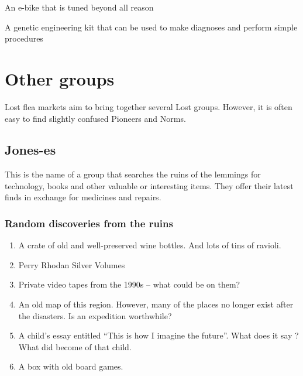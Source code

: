 \begin{npcBox}[title=Flash]
    \begin{consequences}
    \item {}
    \item {}
    \item {}
    \end{consequences}

    \begin{equipment}
    \item An e-bike that is tuned beyond all reason
    \item A genetic engineering kit that can be used to make diagnoses and perform simple procedures
    \end{equipment}
\end{npcBox}
\newpage

\chapter{Other groups}

Lost flea markets aim to bring together several Lost groups. However, it is often easy to find slightly confused Pioneers and Norms.

\section{Jones-es}

This is the name of a group that searches the ruins of the lemmings for technology, books and other valuable or interesting items. They offer their latest finds in exchange for medicines and repairs.

\subsection{Random discoveries from the ruins}

\begin{enumerate}
    \item A crate of old and well-preserved wine bottles. And lots of tins of ravioli.
    \item Perry Rhodan Silver Volumes
    \item Private video tapes from the 1990s – what could be on them?
    \item An old map of this region. However, many of the places no longer exist after the disasters. Is an expedition worthwhile?
    \item A child's essay entitled “This is how I imagine the future”. What does it say ? What did become of that child.
    \item A box with old board games.
\end{enumerate}

